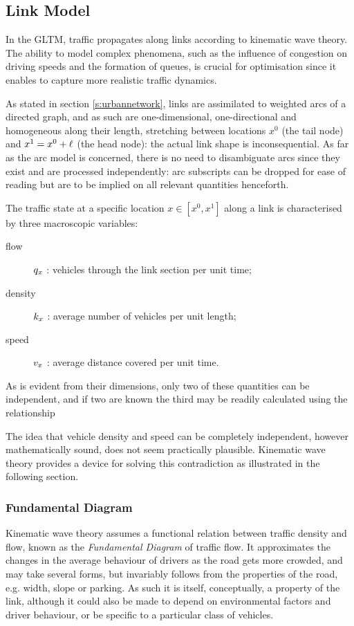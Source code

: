\subsection{Link Model} \label{s:linkmodel}
In the GLTM, traffic propagates along links according to kinematic wave theory.
The ability to model complex phenomena, such as the influence of congestion on driving speeds and the formation of queues, is crucial for optimisation since it enables to capture more realistic traffic dynamics.

As stated in section \ref{s:urbannetwork}, links are assimilated to weighted arcs of a directed graph, and as such are one-dimensional, one-directional and homogeneous along their length, stretching between locations $x^0$ (the tail node) and $x^1 = x^0 + \ell$ (the head node): the actual link shape is inconsequential. As far as the arc model is concerned, there is no need to disambiguate arcs since they exist and are processed independently: arc subscripts can be dropped for ease of reading but are to be implied on all relevant quantities henceforth.

The traffic state at a specific location $x \in \left[x^0, x^1\right]$ along a link is characterised by three macroscopic variables:
\begin{description}
\item[flow] $q_x$ : vehicles through the link section per unit time;
\item[density] $k_x$ : average number of vehicles per unit length;
\item[speed] $v_x$ : average distance covered per unit time.
\end{description}
As is evident from their dimensions, only two of these quantities can be independent, and if two are known the third may be readily calculated using the relationship

The idea that vehicle density and speed can be completely independent, however mathematically sound, does not seem practically plausible. Kinematic wave theory provides a device for solving this contradiction as illustrated in the following section.

\subsubsection{Fundamental Diagram} \label{s:fundiag}
Kinematic wave theory assumes a functional relation between traffic density and flow, known as the \emph{Fundamental Diagram} of traffic flow. It approximates the changes in the average behaviour of drivers as the road gets more crowded, and may take several forms, but invariably follows from the properties of the road, e.g. width, slope or parking. As such it is itself, conceptually, a property of the link, although it could also be made to depend on environmental factors and driver behaviour, or be specific to a particular class of vehicles.

